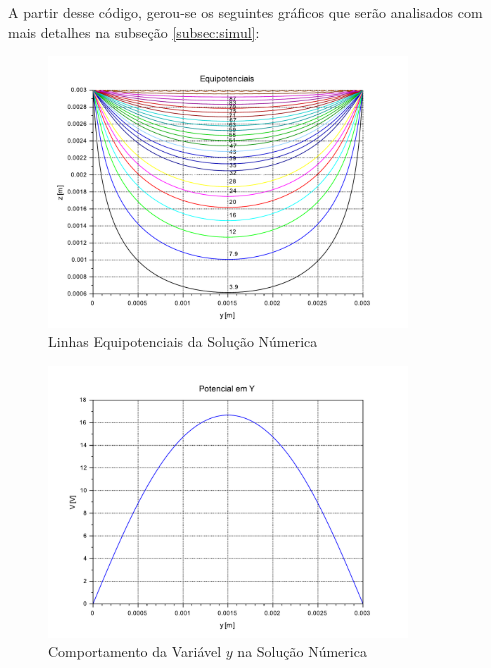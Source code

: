 \documentclass{report}
\begin{document}
A partir desse código, gerou-se os seguintes gráficos que serão analisados com mais detalhes na subseção \ref{subsec:simul}:
\begin{figure}[h!]
  \centering
  \includegraphics[width=0.85\textwidth]{images/plots/numerical_isolines.pdf}
  \caption{\label{plot:numerical_potential_isolines} Linhas Equipotenciais da Solução Númerica}
\end{figure}

\clearpage
\begin{figure}[h!]
  \centering
  \includegraphics[width=0.85\textwidth]{images/plots/numerical_potential_y.pdf}
  \caption{\label{plot:numerical_potential_y} Comportamento da Variável $ y $ na Solução Númerica}
\end{figure}
\end{document}
